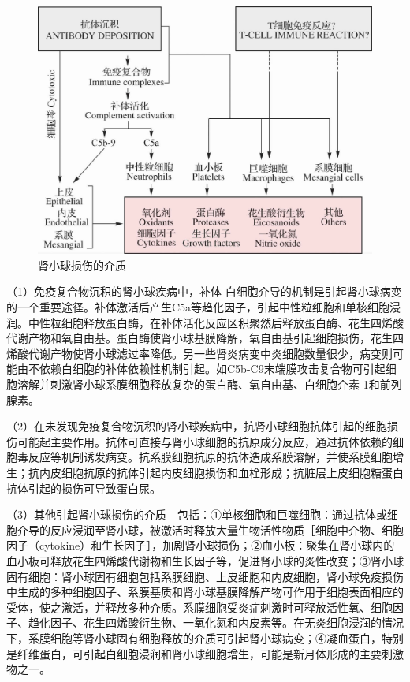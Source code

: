 \begin{figure}[!htbp]
 \centering
 \includegraphics{./images/Image00151.jpg}
 \captionsetup{justification=centering}
 \caption{肾小球损伤的介质}
 \label{fig10-5}
  \end{figure} 

（1）免疫复合物沉积的肾小球疾病中，补体-白细胞介导的机制是引起肾小球病变的一个重要途径。补体激活后产生C5a等趋化因子，引起中性粒细胞和单核细胞浸润。中性粒细胞释放蛋白酶，在补体活化反应区积聚然后释放蛋白酶、花生四烯酸代谢产物和氧自由基。蛋白酶使肾小球基膜降解，氧自由基引起细胞损伤，花生四烯酸代谢产物使肾小球滤过率降低。另一些肾炎病变中炎细胞数量很少，病变则可能由不依赖白细胞的补体依赖性机制引起。如C5b-C9末端膜攻击复合物可引起细胞溶解并刺激肾小球系膜细胞释放复杂的蛋白酶、氧自由基、白细胞介素-1和前列腺素。

（2）在未发现免疫复合物沉积的肾小球疾病中，抗肾小球细胞抗体引起的细胞损伤可能起主要作用。抗体可直接与肾小球细胞的抗原成分反应，通过抗体依赖的细胞毒反应等机制诱发病变。抗系膜细胞抗原的抗体造成系膜溶解，并使系膜细胞增生；抗内皮细胞抗原的抗体引起内皮细胞损伤和血栓形成；抗脏层上皮细胞糖蛋白抗体引起的损伤可导致蛋白尿。

（3）其他引起肾小球损伤的介质　包括：①单核细胞和巨噬细胞：通过抗体或细胞介导的反应浸润至肾小球，被激活时释放大量生物活性物质［细胞中介物、细胞因子（cytokine）和生长因子］，加剧肾小球损伤；②血小板：聚集在肾小球内的血小板可释放花生四烯酸代谢物和生长因子等，促进肾小球的炎性改变；③肾小球固有细胞：肾小球固有细胞包括系膜细胞、上皮细胞和内皮细胞，肾小球免疫损伤中生成的多种细胞因子、系膜基质和肾小球基膜降解产物可作用于细胞表面相应的受体，使之激活，并释放多种介质。系膜细胞受炎症刺激时可释放活性氧、细胞因子、趋化因子、花生四烯酸衍生物、一氧化氮和内皮素等。在无炎细胞浸润的情况下，系膜细胞等肾小球固有细胞释放的介质可引起肾小球病变；④凝血蛋白，特别是纤维蛋白，可引起白细胞浸润和肾小球细胞增生，可能是新月体形成的主要刺激物之一。

